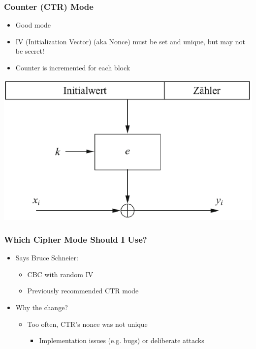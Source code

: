 \subsubsection{Counter (CTR) Mode}
\begin{minipage}{0.5\linewidth}
\begin{itemize}
  \item Good mode
  \item IV (Initialization Vector) (aka Nonce) must be set and unique, but may not be secret!
  \item Counter is incremented for each block
\end{itemize}
\end{minipage}
\begin{minipage}{0.5\linewidth}
  \includegraphics[width=\linewidth]{images/EmbeddedSecurity/ctrBlock}
\end{minipage}

\subsubsection{Which Cipher Mode Should I Use?}
\begin{itemize}
  \item Says Bruce Schneier:
  \begin{itemize}
    \item CBC with random IV
    \item Previously recommended CTR mode
  \end{itemize}
  \item Why the change?
  \begin{itemize}
    \item Too often, CTR's nonce was not unique
    \begin{itemize}
      \item Implementation issues (e.g. bugs) or deliberate attacks
    \end{itemize}
  \end{itemize}
\end{itemize}

